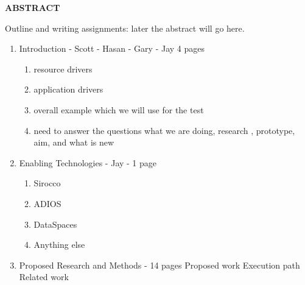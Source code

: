 \vspace{-\belowdisplayskip}
\vspace{-\abovedisplayskip}
\medskip

\begin{center}
\textbf{ABSTRACT}
\end{center}

\vspace{-\belowdisplayskip}

\enlargethispage{2\baselineskip}

\noindent
Outline and writing assignments:
later the abstract will go here.
\begin{enumerate}
\item Introduction - Scott - Hasan - Gary - Jay 4 pages
   \begin{enumerate}
      \item resource drivers
      \item application drivers
      \item overall example which we will use for the test
      \item  need to answer the questions what we are doing, research  , prototype, aim, and what is new
   \end{enumerate}
\item Enabling Technologies - Jay - 1 page
   \begin{enumerate}
   	\item Sirocco
   	\item ADIOS
   	\item DataSpaces
   	\item Anything else
   \end{enumerate}
 \item {Proposed Research and Methods} - 14 pages
          Proposed work
          Execution path
          Related work


\end{enumerate}
